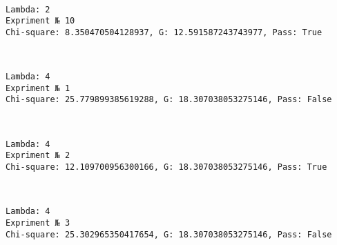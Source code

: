 \documentclass[11pt]{article}
\begin{document}
    \begin{center}
    \end{center}
    { \hspace*{\fill} \\}
    
    \begin{Verbatim}[commandchars=\\\{\}]
Lambda: 2
Expriment № 10
Chi-square: 8.350470504128937, G: 12.591587243743977, Pass: True
    \end{Verbatim}

    \begin{center}
    \end{center}
    { \hspace*{\fill} \\}
    
    \begin{Verbatim}[commandchars=\\\{\}]
Lambda: 4
Expriment № 1
Chi-square: 25.779899385619288, G: 18.307038053275146, Pass: False
    \end{Verbatim}

    \begin{center}
    \end{center}
    { \hspace*{\fill} \\}
    
    \begin{Verbatim}[commandchars=\\\{\}]
Lambda: 4
Expriment № 2
Chi-square: 12.109700956300166, G: 18.307038053275146, Pass: True
    \end{Verbatim}

    \begin{center}
    \end{center}
    { \hspace*{\fill} \\}
    
    \begin{Verbatim}[commandchars=\\\{\}]
Lambda: 4
Expriment № 3
Chi-square: 25.302965350417654, G: 18.307038053275146, Pass: False
    \end{Verbatim}
\end{document}
